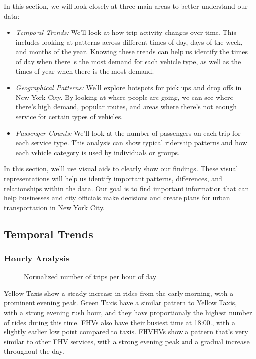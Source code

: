 \documentclass[conference]{IEEEtran}
\begin{document}
In this section, we will look closely at three main areas to better understand our data:
\begin{itemize}
  \item \emph{Temporal Trends:} We'll look at how trip activity changes over time. This includes looking at patterns
    across different times of day, days of the week, and months of the year. Knowing these trends can help us identify the
    times of day when there is the most demand for each vehicle type, as well as the times of year when there is the most
    demand.
  \item \emph{Geographical Patterns:} We'll explore hotspots for pick ups and drop offs in New York City. By looking at
    where people are going, we can see where there's high demand, popular routes, and areas where there's not enough
    service for certain types of vehicles.
  \item \emph{Passenger Counts:} We'll look at the number of passengers on each trip for each service type. This
    analysis can show typical ridership patterns and how each vehicle category is used by individuals or groups.
\end{itemize}
In this section, we'll use visual aids to clearly show our findings. These visual representations will help us identify
important patterns, differences, and relationships within the data. Our goal is to find important information that can
help businesses and city officials make decisions and create plans for urban transportation in New York City.

\subsection{Temporal Trends}

\subsubsection{Hourly Analysis}

\begin{figure}[htbp]
  \label{fig:hourly-line-plot}
  \centering
  
  \caption{Normalized number of trips per hour of day}
\end{figure}

Yellow Taxis show a steady increase in rides from the early morning, with a prominent evening peak. Green Taxis have a
similar pattern to Yellow Taxis, with a strong evening rush hour, and they have proportionaly the highest number of
rides during this time. FHVs also have their busiest time at 18:00., with a slightly earlier low point compared to taxis.
FHVHVs show a pattern that's very similar to other FHV services, with a strong evening peak and a gradual increase
throughout the day.
\end{document}
